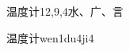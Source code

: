 \begin{entry}{温度计}{12,9,4}{⽔、⼴、⾔}
  \begin{phonetics}{温度计}{wen1du4ji4}
  \end{phonetics}
\end{entry}
